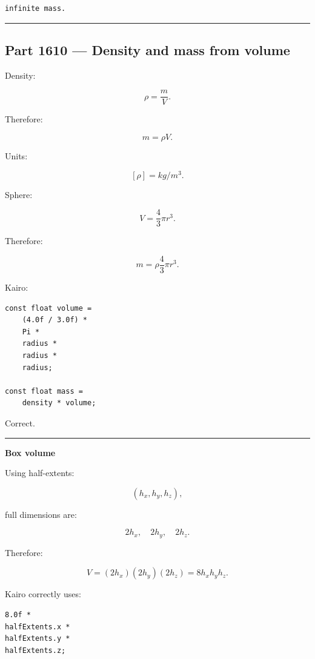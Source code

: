 \begin{verbatim}
infinite mass.
\end{verbatim}

\begin{center}\rule{0.5\linewidth}{0.5pt}\end{center}

\subsection{Part 1610 --- Density and mass from volume}\label{06-engine-ii-ch034-part-1610-density-and-mass-from-volume}

\hypertarget{06-engine-ii-ch034-part-1610-density-and-mass-from-volume}{}

Density:

\[
\rho
=
\frac{m}{V}.
\]

Therefore:

\[
\boxed{
m=\rho V.
}
\]

Units:

\[
[\rho]
=
kg/m^3.
\]

Sphere:

\[
V=
\frac{4}{3}\pi r^3.
\]

Therefore:

\[
m=
\rho
\frac{4}{3}\pi r^3.
\]

Kairo:

\begin{verbatim}
const float volume =
    (4.0f / 3.0f) *
    Pi *
    radius *
    radius *
    radius;

const float mass =
    density * volume;
\end{verbatim}

Correct.

\begin{center}\rule{0.5\linewidth}{0.5pt}\end{center}

\textbf{Box volume}

Using half-extents:

\[
(h_x,h_y,h_z),
\]

full dimensions are:

\[
2h_x,\quad2h_y,\quad2h_z.
\]

Therefore:

\[
V=
(2h_x)(2h_y)(2h_z)
=
8h_xh_yh_z.
\]

Kairo correctly uses:

\begin{verbatim}
8.0f *
halfExtents.x *
halfExtents.y *
halfExtents.z;
\end{verbatim}

